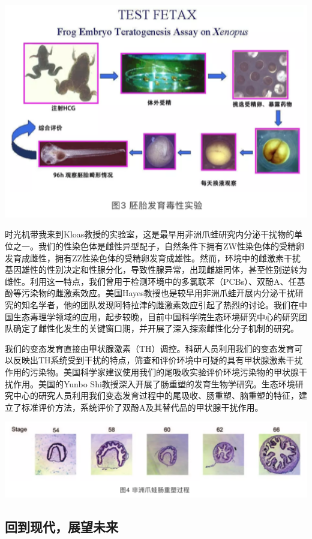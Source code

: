 \documentclass[]{book}
\begin{document}
\includegraphics[width=6.67in]{images/qingwa3}

时光机带我来到Kloas教授的实验室，这是最早用非洲爪蛙研究内分泌干扰物的单位之一。我们的性染色体是雌性异型配子，自然条件下拥有ZW性染色体的受精卵发育成雌性，拥有ZZ性染色体的受精卵发育成雄性。然而，环境中的雌激素干扰基因雄性的性别决定和性腺分化，导致性腺异常，出现雌雄同体，甚至性别逆转为雌性。利用这一特点，我们曾用于检测环境中的多氯联苯（PCBs）、双酚A、任基酚等污染物的雌激素效应。美国Hayes教授也是较早用非洲爪蛙开展内分泌干扰研究的知名学者，他的团队发现阿特拉津的雌激素效应引起了热烈的讨论。我们在中国生态毒理学领域的应用，起步较晚，目前中国科学院生态环境研究中心的研究团队确定了雌性化发生的关键窗口期，并开展了深入探索雌性化分子机制的研究。

我们的变态发育直接由甲状腺激素（TH）调控。科研人员利用我们的变态发育可以反映出TH系统受到干扰的特点，筛查和评价环境中可疑的具有甲状腺激素干扰作用的污染物。美国科学家建议使用我们的尾吸收实验评价环境污染物的甲状腺干扰作用。美国的Yunbo
Shi教授深入开展了肠重塑的发育生物学研究。生态环境研究中心的研究人员利用我们变态发育过程中的尾吸收、肠重塑、脑重塑的特征，建立了标准评价方法，系统评价了双酚A及其替代品的甲状腺干扰作用。

\includegraphics[width=6.67in]{images/qingwa4}

\subsection{回到现代，展望未来}
\end{document}
